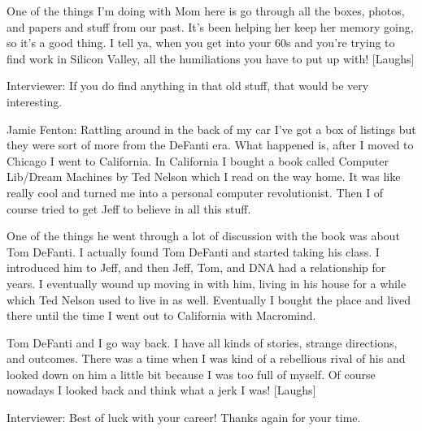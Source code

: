 One of the things I’m doing with Mom here is go through all the boxes, photos, and papers and stuff from our past. It’s been helping her keep her memory going, so it’s a good thing. I tell ya, when you get into your 60s and you’re trying to find work in Silicon Valley, all the humiliations you have to put up with! [Laughs]

\textcolor{interviewer}{Interviewer:} If you do find anything in that old stuff, that would be very interesting.

\textcolor{interviewee}{Jamie Fenton:} Rattling around in the back of my car I’ve got a box of listings but they were sort of more from the DeFanti era. What happened is, after I moved to Chicago I went to California. In California I bought a book called Computer Lib/Dream Machines by Ted Nelson which I read on the way home. It was like really cool and turned me into a personal computer revolutionist. Then I of course tried to get Jeff to believe in all this stuff.

One of the things he went through a lot of discussion with the book was about Tom DeFanti. I actually found Tom DeFanti and started taking his class. I introduced him to Jeff, and then Jeff, Tom, and DNA had a relationship for years. I eventually wound up moving in with him, living in his house for a while which Ted Nelson used to live in as well. Eventually I bought the place and lived there until the time I went out to California with Macromind.

Tom DeFanti and I go way back. I have all kinds of stories, strange directions, and outcomes. There was a time when I was kind of a rebellious rival of his and looked down on him a little bit because I was too full of myself. Of course nowadays I looked back and think what a jerk I was! [Laughs] 

\textcolor{interviewer}{Interviewer:} Best of luck with your career! Thanks again for your time.
